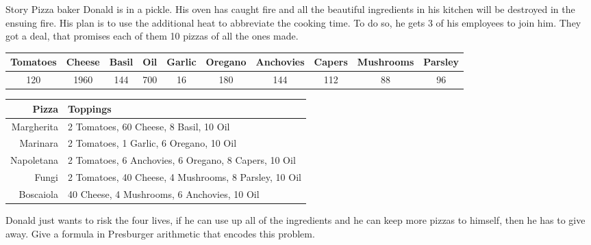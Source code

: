 \documentclass[a4paper]{article}
\begin{document}


\begin{exercise}{Story}
Pizza baker Donald is in a pickle. His oven has caught fire and all the beautiful ingredients in his kitchen will be destroyed in the ensuing fire. His plan is to use the additional heat to abbreviate the cooking time. To do so, he gets 3 of his employees to join him. They got a deal, that promises each of them 10 pizzas of all the ones made.

\begin{center}
  \begin{tabular}{ c | c | c | c | c | c | c | c | c | c }
    Tomatoes & Cheese & Basil & Oil & Garlic & Oregano & Anchovies & Capers & Mushrooms & Parsley\\
    \hline\hline
    120 & 1960 & 144 & 700 & 16 & 180 & 144 & 112 & 88 & 96
  \end{tabular}
\end{center}
\begin{center}
  \begin{tabular}{ r | l }
    Pizza & Toppings \\
    \hline\hline
    Margherita & 2 Tomatoes, 60 Cheese, 8 Basil, 10 Oil \\
    Marinara & 2 Tomatoes, 1 Garlic, 6 Oregano, 10 Oil \\
    Napoletana & 2 Tomatoes, 6 Anchovies, 6 Oregano, 8 Capers, 10 Oil \\
    Fungi & 2 Tomatoes, 40 Cheese, 4 Mushrooms, 8 Parsley, 10 Oil \\
    Boscaiola & 40 Cheese, 4 Mushrooms, 6 Anchovies, 10 Oil \\
  \end{tabular}
\end{center}

Donald just wants to risk the four lives, if he can use up all of the ingredients and he can keep more pizzas to himself, then he has to give away. Give a formula in Presburger arithmetic that encodes this problem.
\end{exercise}

\end{document}
